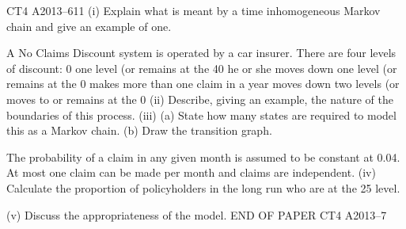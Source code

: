 CT4 A2013–611
(i)
Explain what is meant by a time inhomogeneous Markov chain and give an
example of one.

A No Claims Discount system is operated by a car insurer. There are four levels of
discount: 0%
one level (or remains at the 40%
he or she moves down one level (or remains at the 0%
makes more than one claim in a year moves down two levels (or moves to or remains
at the 0%
(ii) Describe, giving an example, the nature of the boundaries of this process. 
(iii) (a)
State how many states are required to model this as a Markov chain.
(b)
Draw the transition graph.

The probability of a claim in any given month is assumed to be constant at 0.04. At
most one claim can be made per month and claims are independent.
(iv) Calculate the proportion of policyholders in the long run who are at the 25%
level.

(v) Discuss the appropriateness of the model.
END OF PAPER
CT4 A2013–7


\newpage


